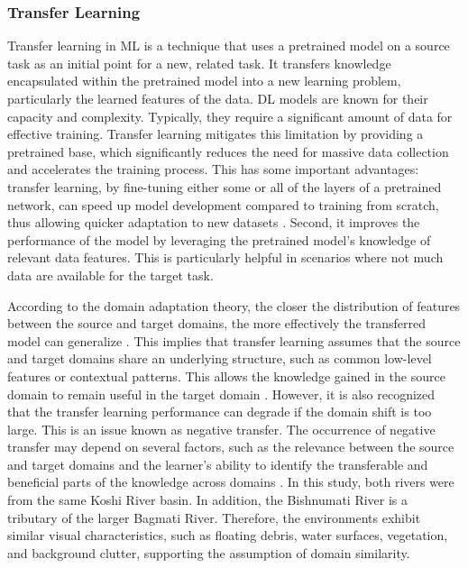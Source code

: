 \documentclass{ieeeaccess}
\begin{document}
\subsubsection{Transfer Learning}
Transfer learning in ML is a technique that uses a pretrained model on a source task as an initial point for a new, related task. It transfers knowledge encapsulated within the pretrained model into a new learning problem, particularly the learned features of the data. DL models are known for their capacity and complexity. Typically, they require a significant amount of data for effective training. Transfer learning mitigates this limitation by providing a pretrained base, which significantly reduces the need for massive data collection and accelerates the training process. This has some important advantages: transfer learning, by fine-tuning either some or all of the layers of a pretrained network, can speed up model development compared to training from scratch, thus allowing quicker adaptation to new datasets \cite{maitra2015cnn}. Second, it improves the performance of the model by leveraging the pretrained model's knowledge of relevant data features. This is particularly helpful in scenarios where not much data are available for the target task.

According to the domain adaptation theory, the closer the distribution of features between the source and target domains, the more effectively the transferred model can generalize \cite{mansour2009domain}. This implies that transfer learning assumes that the source and target domains share an underlying structure, such as common low-level features or contextual patterns. This allows the knowledge gained in the source domain to remain useful in the target domain \cite{weiss2016survey}. However, it is also recognized that the transfer learning performance can degrade if the domain shift is too large. This is an issue known as negative transfer. The occurrence of negative transfer may depend on several factors, such as the relevance between the source and target domains and the learner's ability to identify the transferable and beneficial parts of the knowledge across domains \cite{zhuang2020comprehensive}. In this study, both rivers were from the same Koshi River basin. In addition, the Bishnumati River is a tributary of the larger Bagmati River. Therefore, the environments exhibit similar visual characteristics, such as floating debris, water surfaces, vegetation, and background clutter, supporting the assumption of domain similarity.
\end{document}
